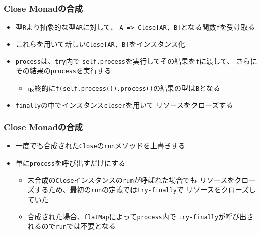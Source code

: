 \begin{frame}
  \frametitle{Close Monadの合成}

  

  \begin{itemize}
    \item<2-> 型\lstinline|R|より抽象的な型\lstinline|AR|に対して、
    \lstinline|A => Close[AR, B]|となる関数\lstinline|f|を受け取る
    \item<3-> これらを用いて新しい\lstinline|Close[AR, B]|をインスタンス化
    \item<4-> \lstinline|process|は、\lstinline|try|内で
    \lstinline|self.process|を実行してその結果を\lstinline|f|に渡して、
    さらにその結果の\lstinline|process|を実行する
    \begin{itemize}
      \item<5-> 最終的に\lstinline|f(self.process()).process()|の結果の型は\lstinline|B|となる
    \end{itemize}
    \item<6-> \lstinline|finally|の中でインスタンス\lstinline|closer|を用いて
    リソースをクローズする
  \end{itemize}
\end{frame}

\begin{frame}
  \frametitle{Close Monadの合成}

  

  \begin{itemize}
    \item<2-> 一度でも合成された\lstinline|Close|の\lstinline|run|メソッドを上書きする
    \item<3-> 単に\lstinline|process|を呼び出すだけにする
    \begin{itemize}
      \item<4-> 未合成の\lstinline|Close|インスタンスの\lstinline|run|が呼ばれた場合でも
      リソースをクローズするため、最初の\lstinline|run|の定義では\lstinline|try-finally|で
      リソースをクローズしていた
      \item<5-> 合成された場合、\lstinline|flatMap|によって\lstinline|process|内で
      \lstinline|try-finally|が呼び出されるので\lstinline|run|では不要となる
    \end{itemize}
  \end{itemize}
\end{frame}

